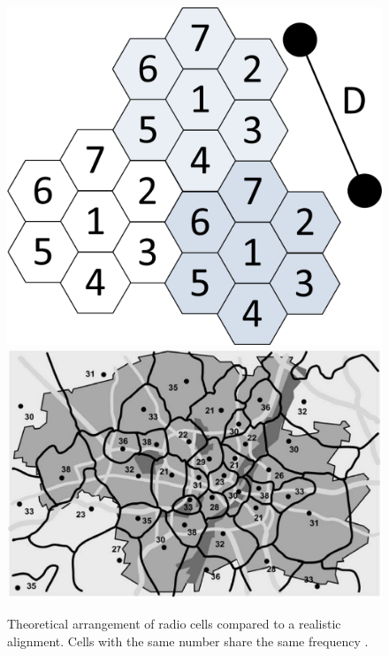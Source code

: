 \begin{figure}
\centering
\includegraphics{../Images/Cells}
\hspace{1cm}
\includegraphics[scale=.21]{../Images/real_Cells}
\caption{Theoretical arrangement of radio cells compared to a realistic alignment. Cells with the same number share the same frequency \cite{GSM2009}.}
\label{fig:cells}
\end{figure}

